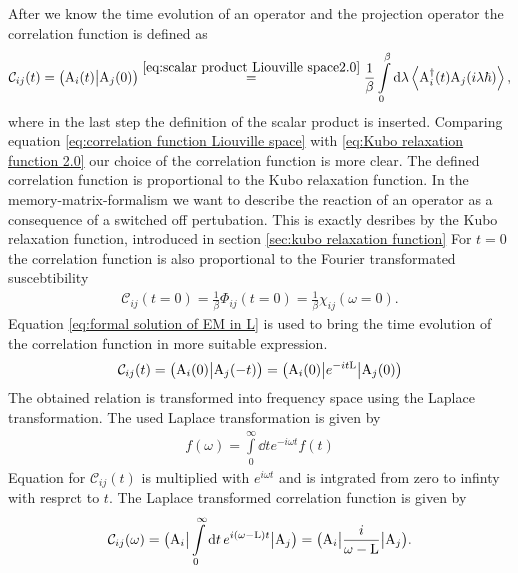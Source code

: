 After we know the time evolution of an operator and the projection operator the correlation function is defined as
%
\begin{align}
	\mathcal{C}_{ij}(t) = \big({\mathrm{A}_{i}(t)}\big|{\mathrm{A}_{j}(0)}\big) \overset{\eqref{eq:scalar product Liouville space2.0}}{=} \frac{1}{\beta} \int\limits_{0}^{\beta} \dd{\lambda} \expval{\mathrm{A}_{i}^{\dag}(t) \mathrm{A}_{j}(i\lambda\hbar)},
	\label{eq:correlation function Liouville space}
\end{align}
%
where in the last step the definition of the scalar product is inserted.
Comparing equation \eqref{eq:correlation function Liouville space} with \eqref{eq:Kubo relaxation function 2.0} our choice of the correlation function is more clear.
The defined correlation function is proportional to the Kubo relaxation function.
In the memory-matrix-formalism we want to describe the reaction of an operator as a consequence of a switched off pertubation.
This is exactly desribes by the Kubo relaxation function, introduced in section \ref{sec:kubo relaxation function}
For $t=0$ the correlation function is also proportional to the Fourier transformated suscebtibility
%
\begin{align}
	\mathcal{C}_{ij}(t = 0) = \frac{1}{\beta} \Phi_{ij}(t = 0) = \frac{1}{\beta} \chi_{ij}(\omega = 0).
	\label{eq:relation between C, Phi and chi}
\end{align}
%
Equation \eqref{eq:formal solution of EM in L} is used to bring the time evolution of the correlation function in more suitable expression.
%
\begin{align}
	\mathcal{C}_{ij}(t) = \big({\mathrm{A}_{i}(0)}\big|{\mathrm{A}_{j}(-t)}\big) = \big({\mathrm{A}_{i}(0)}\big| e^{-it\mathrm{L}} \big|{\mathrm{A}_{j}(0)}\big)
\end{align}
%
The obtained relation is transformed into frequency space using the Laplace transformation.
The used Laplace transformation is given by
%
\begin{align}
	f(\omega) = \int\limits_{0}^{\infty} \dd{t} e^{-i\omega t} f(t)
\end{align}
%
Equation for $\mathcal{C}_{ij}(t)$ is multiplied with $e^{i\omega t}$ and is intgrated from zero to infinty with resprct to $t$.
The Laplace transformed correlation function is given by
%
\begin{align}
	\mathcal{C}_{ij}(\omega) = \big({\mathrm{A}_{i}}\big| \int\limits_{0}^{\infty} \dd{t} e^{i(\omega-\mathrm{L})t} \big|{\mathrm{A}_{j}}\big) = \big({\mathrm{A}_{i}}\big| \frac{i}{\omega - \mathrm{L}} \big|{\mathrm{A}_{j}}\big).
	\label{eq:correlation function frequency space}
\end{align}
